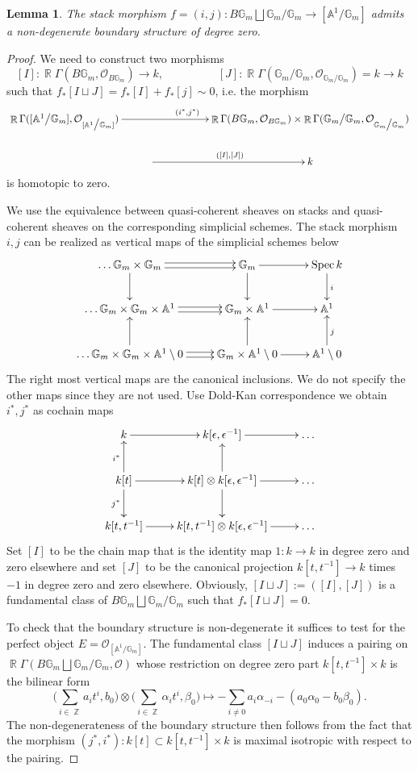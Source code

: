 \documentclass[reqno]{amsart}
\DeclareMathOperator\Z{\mathbb Z}
\DeclareMathOperator\R{\mathbb R}
\newtheorem{lemma}[theorem]{Lemma}
\theoremstyle{definition}
\theoremstyle{remark}
\newcommand{\G}{{\mathbb G}}
\newcommand{\A}{{\mathbb A}}
\newcommand{\ot}{\otimes}
\newcommand{\Spec}{\operatorname{Spec}}
\newcommand{\eps}{\epsilon}
\newcommand{\cO}{\mathcal{O}}
\numberwithin{equation}{section}
\begin{document}
\begin{lemma}\label{lem: boundary}
The stack morphism $f=(i,j): B\G_m\bigsqcup \G_m\big/\G_m\to [\A^1\big/\G_m]$ admits a non-degenerate boundary structure of degree zero.
\end{lemma}
\begin{proof}
We need to construct two morphisms
\[
[I]: \R\Gamma(B\G_m, \cO_{B\G_m})\to k, \hspace{2cm} [J]: \R\Gamma(\G_m\big/\G_m, \cO_{\G_m\big/\G_m})=k\to k
\] such that $f_*[I\sqcup J]=f_*[I]+f_*[j]\sim 0$, i.e. the morphism 
\[\xymatrix{
\R\Gamma([\A^1\big/\G_m], \cO_{[\A^1\big/\G_m]})\ar[rrr]^{(i^*,j^*)}  &&& \R\Gamma(B\G_m, \cO_{B\G_m})\times \R\Gamma(\G_m\big/\G_m, \cO_{\G_m\big/\G_m})\\
&\ar[rr]^{([I],[J])} &&  k}
\] is homotopic to zero.

We use the equivalence between quasi-coherent sheaves on stacks and quasi-coherent sheaves on the corresponding simplicial schemes. The stack morphism $i, j$ can be realized as vertical maps of the simplicial schemes below
\[
\xymatrix{
\ldots \G_m\times\G_m\ar@<-.5ex>[r]\ar@<+.5ex>[r]\ar[d] & \G_m\ar[r]\ar[d] &\Spec k\ar[d]^i\\
\ldots \G_m\times\G_m\times \A^1\ar@<-.5ex>[r]\ar@<+.5ex>[r] & \G_m\times \A^1\ar[r] &\A^1\\
\ldots \G_m\times\G_m\times \A^1\setminus 0\ar@<-.5ex>[r]\ar@<+.5ex>[r]\ar[u] & \G_m\times \A^1\setminus 0\ar[r]\ar[u] &\A^1\setminus 0\ar[u]_j\\
}
\] The right most vertical maps are the canonical inclusions. 
We do not specify the other maps since they are not used. 
Use Dold-Kan correspondence we obtain $i^*, j^*$ as cochain maps
\[
\xymatrix{
k\ar[r] & k[\eps,\eps^{-1}]\ar[r] &\ldots\\
k[t]\ar[r]\ar[u]^{i^*}\ar[d]_{j^*} & k[t]\ot k[\eps,\eps^{-1}]\ar[r]\ar[u]\ar[d] &\ldots\\
k[t,t^{-1}]\ar[r] &k[t,t^{-1}]\ot k[\eps,\eps^{-1}]\ar[r] &\ldots\\
}
\] Set $[I]$ to be the chain map that is the 
identity map
$1: k\to k$ in degree zero and zero elsewhere  and set $[J]$ to be the canonical projection $k[t,t^{-1}]\to k$ times $-1$ in degree zero and zero elsewhere.
Obviously, $[I\sqcup J]:=([I],[J])$ is a fundamental class of $B\G_m\bigsqcup \G_m\big/\G_m$ such that $f_*[I\sqcup J]=0$.

To check that the boundary structure is non-degenerate it suffices to test for the perfect object $E=\cO_{[\A^1\big/\G_m]}$. The fundamental class $[I\sqcup J]$ induces a pairing on $\R\Gamma(B\G_m\bigsqcup \G_m\big/\G_m, \cO)$ whose restriction on degree zero part $k[t,t^{-1}]\times k$ is the bilinear form
\[
\Big(\sum_{i\in\Z} a_it^i, b_0\Big) \ot \Big(\sum_{i\in\Z} \alpha_it^i, \beta_0\Big)\mapsto -\sum_{i\neq 0} a_i\alpha_{-i} -(a_0\alpha_0-b_0\beta_0). 
\]
The non-degenerateness of the boundary structure then follows from the fact that the morphism $(j^*,i^*): k[t]\subset k[t,t^{-1}]\times k$ is maximal isotropic with respect to the pairing.
\end{proof}
\end{document}

